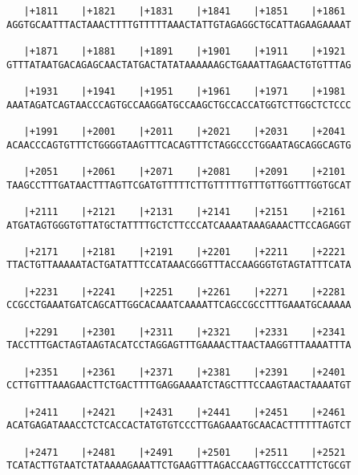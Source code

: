 \documentclass{article}
\begin{document}
\begin{Verbatim}
   |+1811    |+1821    |+1831    |+1841    |+1851    |+1861 
AGGTGCAATTTACTAAACTTTTGTTTTTAAACTATTGTAGAGGCTGCATTAGAAGAAAAT
                                                            
   |+1871    |+1881    |+1891    |+1901    |+1911    |+1921 
GTTTATAATGACAGAGCAACTATGACTATATAAAAAAGCTGAAATTAGAACTGTGTTTAG
                                                            
   |+1931    |+1941    |+1951    |+1961    |+1971    |+1981 
AAATAGATCAGTAACCCAGTGCCAAGGATGCCAAGCTGCCACCATGGTCTTGGCTCTCCC
                                                            
   |+1991    |+2001    |+2011    |+2021    |+2031    |+2041 
ACAACCCAGTGTTTCTGGGGTAAGTTTCACAGTTTCTAGGCCCTGGAATAGCAGGCAGTG
                                                            
   |+2051    |+2061    |+2071    |+2081    |+2091    |+2101 
TAAGCCTTTGATAACTTTAGTTCGATGTTTTTCTTGTTTTTGTTTGTTGGTTTGGTGCAT
                                                            
   |+2111    |+2121    |+2131    |+2141    |+2151    |+2161 
ATGATAGTGGGTGTTATGCTATTTTGCTCTTCCCATCAAAATAAAGAAACTTCCAGAGGT
                                                            
   |+2171    |+2181    |+2191    |+2201    |+2211    |+2221 
TTACTGTTAAAAATACTGATATTTCCATAAACGGGTTTACCAAGGGTGTAGTATTTCATA
                                                            
   |+2231    |+2241    |+2251    |+2261    |+2271    |+2281 
CCGCCTGAAATGATCAGCATTGGCACAAATCAAAATTCAGCCGCCTTTGAAATGCAAAAA
                                                            
   |+2291    |+2301    |+2311    |+2321    |+2331    |+2341 
TACCTTTGACTAGTAAGTACATCCTAGGAGTTTGAAAACTTAACTAAGGTTTAAAATTTA
                                                            
   |+2351    |+2361    |+2371    |+2381    |+2391    |+2401 
CCTTGTTTAAAGAACTTCTGACTTTTGAGGAAAATCTAGCTTTCCAAGTAACTAAAATGT
                                                            
   |+2411    |+2421    |+2431    |+2441    |+2451    |+2461 
ACATGAGATAAACCTCTCACCACTATGTGTCCCTTGAGAAATGCAACACTTTTTTAGTCT
                                                            
   |+2471    |+2481    |+2491    |+2501    |+2511    |+2521 
TCATACTTGTAATCTATAAAAGAAATTCTGAAGTTTAGACCAAGTTGCCCATTTCTGCGT
                                                            

\end{Verbatim}
\end{document}
